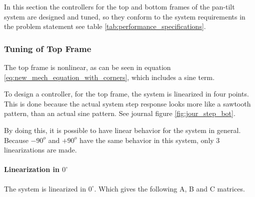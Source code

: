\documentclass[../../../Main]{subfiles}
\begin{document}
\label{sec:PI}
In this section the controllers for the top and bottom frames of the pan-tilt system are designed and tuned, so they conform to the system requirements in the problem statement see table \ref{tab:performance_specifications}.

\subsubsection{Tuning of Top Frame}
\label{sec:top_frame_tuning}
The top frame is nonlinear, as can be seen in equation \eqref{eq:new_mech_equation_with_corners}, which includes a sine term.

To design a controller, for the top frame, the system is linearized in four points. This is done because the actual system step response looks more like a sawtooth pattern, than an actual sine pattern. See journal figure \ref{fig:jour_step_bot}.

By doing this, it is possible to have linear behavior for the system in general.
Because $-90^o$ and  $+90^o$ have the same behavior in this system, only 3 linearizations are made.

\paragraph{Linearization in $0^\circ$}
\label{sec:linearize}
The system is linearized in $0^\circ$. Which gives the following A, B and C matrices.
\end{document}
